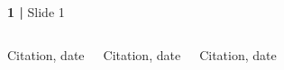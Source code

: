 



\begin{frame}{\textbf{1 |} Slide 1}

\begin{columns}

\column[c]{4cm}
\centering\tiny{Citation, date}

\column[c]{4cm}
\centering\tiny{Citation, date}


\column[c]{4cm}
\centering\tiny{Citation, date}


\end{columns}

\end{frame}


